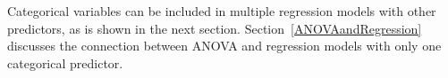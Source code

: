 Categorical variables can be included in multiple regression models with other predictors, as is shown in the next section. Section~\ref{ANOVAandRegression} discusses the connection between ANOVA and regression models with only one categorical predictor.

